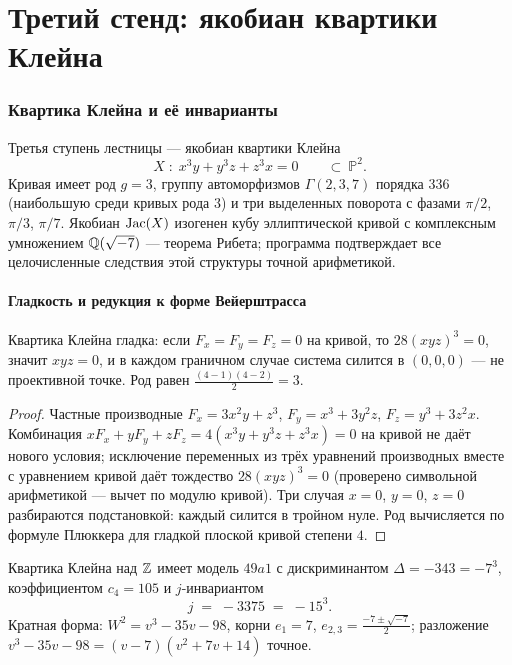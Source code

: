 \part{Третий стенд: якобиан квартики Клейна}

\section{Квартика Клейна и её инварианты}\label{sec:klein}

Третья ступень лестницы — якобиан квартики Клейна
\[
  X\;:\; x^3y+y^3z+z^3x=0 \qquad \subset\ \mathbb{P}^2.
\]
Кривая имеет род $g=3$, группу автоморфизмов $\Gamma(2,3,7)$ порядка
$336$ (наибольшую среди кривых рода $3$) и три выделенных поворота
с фазами $\pi/2$, $\pi/3$, $\pi/7$. Якобиан $\operatorname{Jac}(X)$ изогенен кубу
эллиптической кривой с комплексным умножением
$\mathbb{Q}(\sqrt{-7})$ — теорема Рибета; программа подтверждает все
целочисленные следствия этой структуры точной арифметикой.

\subsection{Гладкость и редукция к форме Вейерштрасса}

\begin{proposition}\label{prop:klein-smooth}
Квартика Клейна гладка: если $F_x=F_y=F_z=0$ на кривой, то
$28(xyz)^3=0$, значит $xyz=0$, и в каждом граничном случае система
силится в $(0,0,0)$ — не проективной точке. Род равен
$\tfrac{(4-1)(4-2)}{2}=3$.
\end{proposition}

\begin{proof}
Частные производные $F_x=3x^2y+z^3$, $F_y=x^3+3y^2z$, $F_z=y^3+3z^2x$.
Комбинация $xF_x+yF_y+zF_z=4(x^3y+y^3z+z^3x)=0$ на кривой не даёт
нового условия; исключение переменных из трёх уравнений производных
вместе с уравнением кривой даёт тождество $28(xyz)^3=0$
(проверено символьной арифметикой — вычет по модулю кривой).
Три случая $x=0$, $y=0$, $z=0$ разбираются подстановкой: каждый
силится в тройном нуле. Род вычисляется по формуле Плюккера для
гладкой плоской кривой степени $4$.
\end{proof}

\begin{proposition}\label{prop:klein-49a1}
Квартика Клейна над $\mathbb{Z}$ имеет модель $49a1$ с дискриминантом
$\Delta=-343=-7^3$, коэффициентом $c_4=105$ и $j$-инвариантом
\[
  j \;=\; -3375 \;=\; -15^3 .
\]
Кратная форма: $W^2=v^3-35v-98$, корни $e_1=7$,
$e_{2,3}=\tfrac{-7\pm\sqrt{-7}}{2}$; разложение
$v^3-35v-98=(v-7)(v^2+7v+14)$ точное.
\end{proposition}

